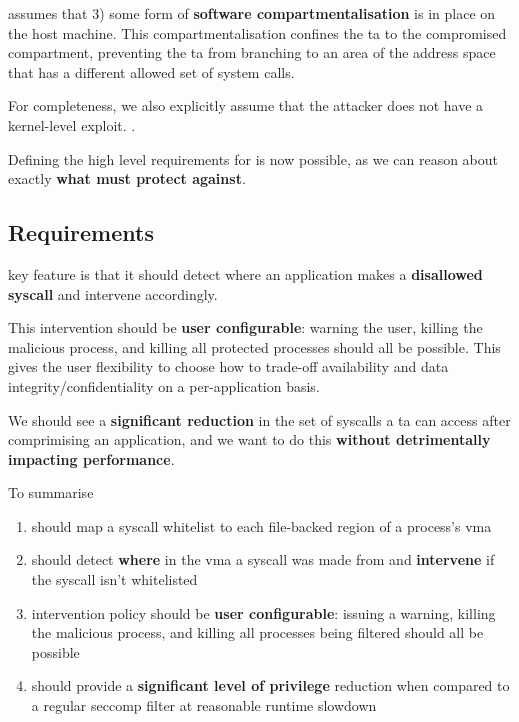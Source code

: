 \af assumes that 3) some form of \textbf{software compartmentalisation} is in
place on the host machine. This compartmentalisation confines the \ac{ta} to the
compromised compartment, preventing the \ac{ta} 
from branching to an area of the address space that has a different allowed set
of system calls.

For completeness, we also explicitly assume that the attacker does not have a
kernel-level exploit. .

Defining the high level requirements for \af is now possible, as we can reason
about exactly \textbf{what \af must protect against}.


\subsection{Requirements} \label{subsec:requirements}

\afg key feature is that it should detect where an application makes a 
\textbf{disallowed syscall} and intervene accordingly. 

This intervention should be \textbf{user configurable}: warning the user, killing 
the malicious process, and killing all protected processes should all be
possible. This gives the user flexibility to choose how to trade-off
availability and data integrity/confidentiality on a per-application basis.

We should see a \textbf{significant reduction} in the set of syscalls a \ac{ta}
can access after comprimising an application, and we want to do this
\textbf{without detrimentally impacting performance}.

To summarise 

\begin{enumerate}
    \item \af should map a syscall whitelist to each file-backed region of a
        process's \ac{vma}
    \item \af should detect \textbf{where} in the \ac{vma} a syscall was made
        from and \textbf{intervene} if the syscall isn't whitelisted
    \item \afg intervention policy should be \textbf{user configurable}: issuing
        a warning, killing the malicious process, and killing all processes
        being filtered should all be possible
    \item \af should provide a \textbf{significant level of privilege} reduction
        when compared to a regular seccomp filter at reasonable runtime slowdown
\end{enumerate}

